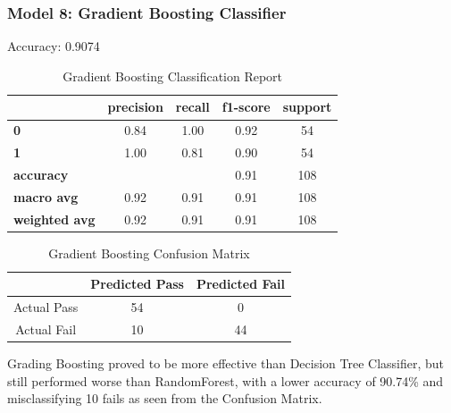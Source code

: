 \documentclass[11pt,a4paper]{article}
\begin{document}
\subsubsection{Model 8: Gradient Boosting Classifier}
Accuracy: 0.9074
\begin{table}[H]
    \centering
    \begin{tabular}{lcccc}
        \hline
        & \textbf{precision} & \textbf{recall} & \textbf{f1-score} & \textbf{support} \\
        \hline
        \textbf{0} & 0.84 & 1.00 & 0.92 & 54 \\
        \textbf{1} & 1.00 & 0.81 & 0.90 & 54 \\
        \hline
        \textbf{accuracy} & & & 0.91 & 108 \\
        \textbf{macro avg} & 0.92 & 0.91 & 0.91 & 108 \\
        \textbf{weighted avg} & 0.92 & 0.91 & 0.91 & 108 \\
        \hline
    \end{tabular}
    \caption{Gradient Boosting Classification Report}
    \label{tab:gbclassification_report}
\end{table}
\begin{table}[H]
    \centering
    \begin{tabular}{|c|c|c|}
        \hline
        & Predicted Pass & Predicted Fail \\ \hline
        Actual Pass & 54 & 0 \\ \hline
        Actual Fail& 10 & 44 \\ \hline
    \end{tabular}
    \caption{Gradient Boosting Confusion Matrix}
    \label{tab:gbconfusion_matrix}
\end{table}
Grading Boosting proved to be more effective than Decision Tree Classifier, but still performed worse than RandomForest, with a lower accuracy of 90.74\% and misclassifying 10 fails as seen from the Confusion Matrix.
\end{document}
